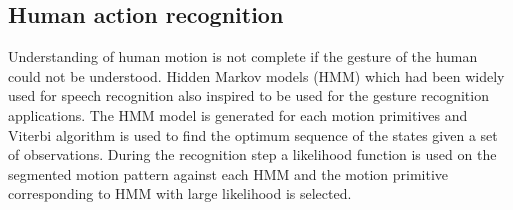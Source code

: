 \subsection{Human action recognition}
Understanding of human motion is not complete if the gesture of the human could not be understood. Hidden Markov models (HMM) which had been widely used for speech recognition \cite{rabiner1989tutorial} also inspired to be used for the gesture recognition applications. The HMM model is generated for each motion primitives and Viterbi algorithm is used to find the optimum sequence of the states given a set of observations. During the recognition step a likelihood function is used on the segmented motion pattern against each HMM and the motion primitive corresponding to HMM with large likelihood is selected.

